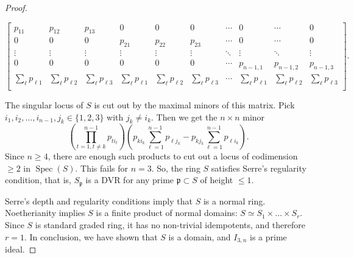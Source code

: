 \documentclass[english]{ourlematema}
\numberwithin{theorem}{section}
\theoremstyle{definition}
\begin{document}
\begin{proof}
\begin{enumerate}
\vspace{-0.1in}
             \begin{smaller}
  $$      \begin{bmatrix}
            p_{11} & p_{12} & p_{13} & 0 & 0 & 0 &\cdots & 0 & \cdots & 0\\ 
                       0 & 0 & 0 & p_{21} & p_{22}   & p_{23} & \cdots & 0 & \cdots & 0\\               
                  \vdots   &  \vdots & \vdots & \vdots   & \vdots & \vdots & \ddots & \vdots & \ddots & \vdots\\
                      0    & 0 &   0    &    0   & 0   &   0    &  \cdots & p_{n-1,1}& p_{n-1,2} & p_{n-1,3}\\
                    \sum\limits_{\ell} p_{\ell 1}    & \sum\limits_{\ell} p_{\ell 2} &   \sum\limits_{\ell} p_{\ell 3}      &  
                              \sum\limits_{\ell} p_{\ell 1}    & \sum\limits_{\ell} p_{\ell 2} &   \sum\limits_{\ell} p_{\ell 3}      & 
                              \cdots &
                                        \sum\limits_{\ell} p_{\ell 1}    & \sum\limits_{\ell} p_{\ell 2} &   \sum\limits_{\ell} p_{\ell 3}      \\
        \end{bmatrix}. $$
        \end{smaller}
        
        The singular locus of $S$ is cut out by the maximal minors of
        this matrix. Pick $i_1, i_2, \dots, i_{n-1}, j_k \in \{1,2,3\}$  with $j_k \neq i_k$.
         Then we get the $n \times n$ minor
 $$
       \left(\prod_{t = 1, t \neq k}^{n-1} p_{t i_t} \right)\left( p_{k i_k} 
       \sum_{\ell=1}^{n-1} p_{\ell j_k } - p_{k j_k}  \sum_{\ell=1}^{n-1} p_{\ell i_k}  \right).
$$
Since $n \geq 4$, 
there are enough such products to cut out a locus of codimension $\geq 2$ in $\operatorname{Spec}(S)$.
           This fails for $n=3$. So, the ring $S$ satisfies Serre's regularity condition, 
           that is, $S_\mathfrak{p}$ is a DVR for any prime $\mathfrak{p} \subset S$ of height $\leq 1$.
    \end{enumerate}

    Serre's depth and regularity conditions imply that $S$ is a normal ring. Noetherianity implies
     $S$ is a finite product of normal domains: $S \simeq S_1 \times \dots \times S_r$. Since $S$ is standard graded ring, it has no non-trivial idempotents, and therefore $r=1$. 
        In conclusion, we have shown that $S$ is a domain, and $I_{3,n}$ is a prime ideal.
\end{proof}
\end{document}
